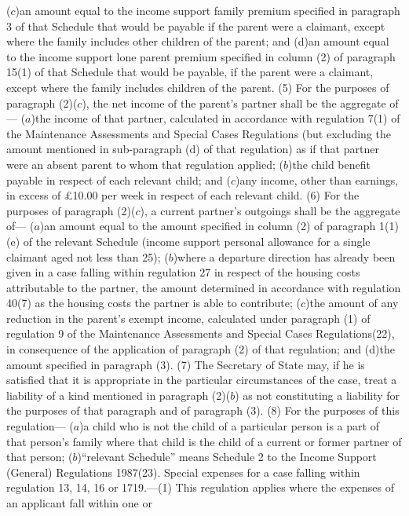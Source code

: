 \documentclass[a4paper]{article}
\begin{document}
($c$)an amount equal to the income support family premium specified in paragraph 3
of that Schedule that would be payable if the parent were a claimant, except
where the family includes other children of the parent; and
(d)an amount equal to the income support lone parent premium specified in column
(2) of paragraph 15(1) of that Schedule that would be payable, if the parent
were a claimant, except where the family includes children of the parent.
(5) For the purposes of paragraph (2)($c$), the net income of the parent’s partner
shall be the aggregate of—
($a$)the income of that partner, calculated in accordance with regulation 7(1) of
the Maintenance Assessments and Special Cases Regulations (but excluding the
amount mentioned in sub-paragraph (d) of that regulation) as if that partner
were an absent parent to whom that regulation applied;
($b$)the child benefit payable in respect of each relevant child; and
($c$)any income, other than earnings, in excess of £10.00 per week in respect of
each relevant child.
(6) For the purposes of paragraph (2)($c$), a current partner’s outgoings shall be
the aggregate of—
($a$)an amount equal to the amount specified in column (2) of paragraph 1(1)(e) of
the relevant Schedule (income support personal allowance for a single claimant
aged not less than 25);
($b$)where a departure direction has already been given in a case falling within
regulation 27 in respect of the housing costs attributable to the partner, the
amount determined in accordance with regulation 40(7) as the housing costs the
partner is able to contribute;
($c$)the amount of any reduction in the parent’s exempt income, calculated under
paragraph (1) of regulation 9 of the Maintenance Assessments and Special Cases
Regulations(22), in consequence of the application of paragraph (2) of that
regulation; and
(d)the amount specified in paragraph (3).
(7) The Secretary of State may, if he is satisfied that it is appropriate in the
particular circumstances of the case, treat a liability of a kind mentioned in
paragraph (2)($b$) as not constituting a liability for the purposes of that
paragraph and of paragraph (3).
(8) For the purposes of this regulation—
($a$)a child who is not the child of a particular person is a part of that
person’s family where that child is the child of a current or former partner of
that person;
($b$)“relevant Schedule” means Schedule 2 to the Income Support (General)
Regulations 1987(23).
Special expenses for a case falling within regulation 13, 14, 16 or 1719.—(1)
This regulation applies where the expenses of an applicant fall within one or
\end{document}
